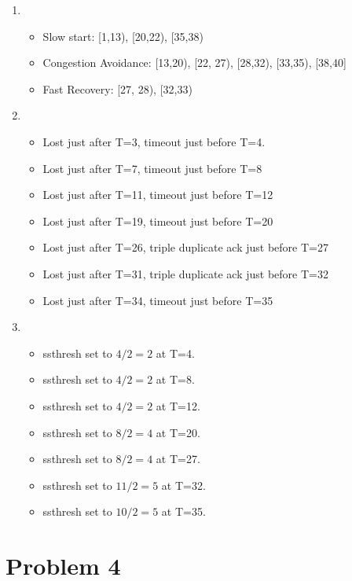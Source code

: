\documentclass[letter,10pt]{article}
\begin{document}
\begin{enumerate}
	\item 
	\begin{itemize}
		\item Slow start: [1,13), [20,22), [35,38) 
		\item Congestion Avoidance: [13,20), [22, 27), [28,32), [33,35), [38,40]
		\item Fast Recovery: [27, 28), [32,33)
	\end{itemize}		
			
	\item 
	\begin{itemize}
		\item Lost just after T=3, timeout just before T=4.
		\item Lost just after T=7, timeout just before T=8
		\item Lost just after T=11, timeout just before T=12
		\item Lost just after T=19, timeout just before T=20
		\item Lost just after T=26, triple duplicate ack just before T=27
		\item Lost just after T=31, triple duplicate ack just before T=32
		\item Lost just after T=34, timeout just before T=35
	\end{itemize}

	\item 
	\begin{itemize}
		\item ssthresh set to $4/2 = 2$ at T=4.
		\item ssthresh set to $4/2 = 2$ at T=8.
		\item ssthresh set to $4/2 = 2$ at T=12.
		\item ssthresh set to $8/2 = 4$ at T=20.
		\item ssthresh set to $8/2 = 4$ at T=27.
		\item ssthresh set to $11/2 = 5$ at T=32.
		\item ssthresh set to $10/2 = 5$ at T=35.
	\end{itemize}
\end{enumerate}

\section{Problem 4}
\end{document}
